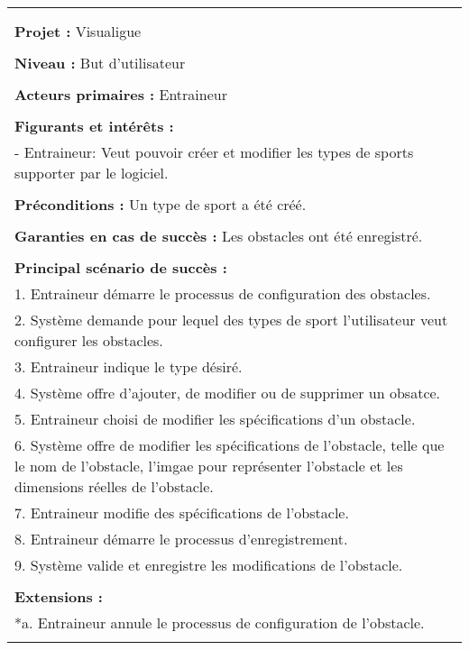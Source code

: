 \begin{longtable}{|p{16cm}|}
\newpage
\begin{flushleft}
	\textbf{Cas d'utilisation 8 : Configurer les obstacles}\\
\end{flushleft}
\begin{tabular}{|p{16cm}|}
	\hline
	\\
	\textbf{Projet :} Visualigue\\
	\\
	\textbf{Niveau :} But d'utilisateur\\
	\\
	\textbf{Acteurs primaires :} Entraineur\\
	\\
	\textbf{Figurants et intérêts :} \\
	- Entraineur: Veut pouvoir créer et modifier les types de sports supporter par le logiciel.\\
	\\
	\textbf{Préconditions :} Un type de sport a été créé.\\
	\\
	\textbf{Garanties en cas de succès :} Les obstacles ont été enregistré.\\
	\\
	\textbf{Principal scénario de succès :}\\
	1. Entraineur démarre le processus de configuration des obstacles.\\
	2. Système demande pour lequel des types de sport l'utilisateur veut configurer les obstacles.\\
	3. Entraineur indique le type désiré.\\
	4. Système offre d'ajouter, de modifier ou de supprimer un obsatce.\\
	5. Entraineur choisi de modifier les spécifications d'un obstacle.\\
	6. Système offre de modifier les spécifications de l'obstacle, telle que le nom de l'obstacle, l'imgae pour représenter l'obstacle et les dimensions réelles de l'obstacle.\\
	7. Entraineur modifie des spécifications de l'obstacle.\\
	8. Entraineur démarre le processus d'enregistrement.\\
	9. Système valide et enregistre les modifications de l'obstacle.\\
	\\
	\textbf{Extensions :}\\
	*a. Entraineur annule le processus de configuration de l'obstacle.\\

\end{tabular}
\end{longtable}
